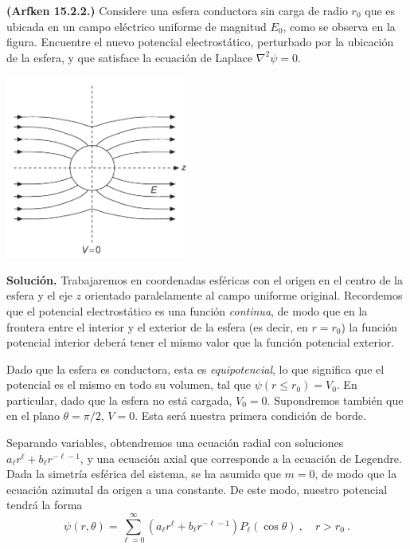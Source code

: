 \begin{ejemplo}
    \textbf{(Arfken 15.2.2.)} Considere una esfera conductora sin carga de radio $r_0$ que es ubicada en un campo eléctrico uniforme de magnitud $E_0$, como se observa en la figura. Encuentre el nuevo potencial electrostático, perturbado por la ubicación de la esfera, y que satisface la ecuación de Laplace $\nabla^2 \psi = 0$.    

    \begin{center}
    \includegraphics[width = 6cm]{Figuras/Ejemplo-esfera-conductora-2.png}
    \end{center}

    \textbf{Solución.} Trabajaremos en coordenadas esféricas con el origen en el centro de la esfera y el eje $z$ orientado paralelamente al campo uniforme original. Recordemos que el potencial electrostático es una función \emph{continua}, de modo que en la frontera entre el interior y el exterior de la esfera (es decir, en $r = r_0$) la función potencial interior deberá tener el mismo valor que la función potencial exterior.
    
    Dado que la esfera es conductora, esta es \emph{equipotencial}, lo que significa que el potencial es el mismo en todo su volumen, tal que $\psi(r \leq r_0) = V_0$. En particular, dado que la esfera no está cargada, $V_0 = 0$. Supondremos también que en el plano $\theta = \pi/2$, $V = 0$. Esta será nuestra primera condición de borde.

    Separando variables, obtendremos una ecuación radial con soluciones $a_\ell r^\ell + b_\ell r^{-\ell-1}$, y una ecuación axial que corresponde a la ecuación de Legendre. Dada la simetría esférica del sistema, se ha asumido que $m=0$, de modo que la ecuación azimutal da origen a una constante. De este modo, nuestro potencial tendrá la forma
    \begin{equation*}
        \psi(r, \theta) = \sum_{\ell = 0}^\infty \left( a_\ell r^\ell + b_\ell r^{-\ell-1} \right) P_\ell(\cos \theta) \ , \quad r > r_0 \ .
    \end{equation*}


\end{ejemplo}
